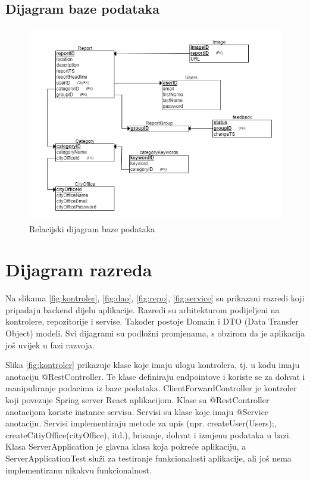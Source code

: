 			\subsection{Dijagram baze podataka}
			
			\begin{figure}[H]
				\includegraphics[width=\textwidth]{slike/relacijski.png} %
				\caption{Relacijski dijagram baze podataka}
				\label{fig:DijagramBazePodataka} %
			\end{figure}
			
			\eject
			
			
		\section{Dijagram razreda}
		
			Na slikama \ref{fig:kontroler}, \ref{fig:dao}, \ref{fig:repo}, \ref{fig:service} su prikazani razredi koji pripadaju backend dijelu aplikacije. Razredi su arhitekturom podijeljeni na kontrolere, repozitorije i servise. Također postoje Domain i DTO (Data Transfer Object) modeli. Svi dijagrami su podložni promjenama, s obzirom da je aplikacija još uvijek u fazi razvoja.
		
			Slika \ref{fig:kontroler} prikazuje klase koje imaju ulogu kontrolera, tj. u kodu imaju anotaciju @RestController. Te klase definiraju endpointove i koriste se za dohvat i manipuliranje podacima iz baze podataka. ClientForwardController je kontroler koji povezuje Spring server React aplikacijom. Klase sa @RestController anotacijom koriste instance servisa. Servisi su klase koje imaju @Service anotaciju. Servisi implementiraju metode za upis (npr. createUser(Users);, createCitiyOffice(cityOffice), itd.), brisanje, dohvat i izmjenu podataka u bazi. Klasa ServerApplication je glavna klasa koja pokreće aplikaciju, a ServerApplicationTest služi za testiranje funkcionalosti aplikacije, ali još nema implementiranu nikakvu funkcionalnost.
		
